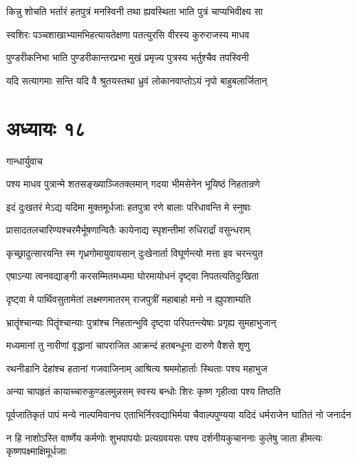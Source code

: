 \twolineshloka
{किन्नु शोचति भर्तारं हतपुत्रं मनस्विनी}
{तथा ह्यवस्थिता भाति पुत्रं चाप्यभिवीक्ष्य सा}


\twolineshloka
{स्वशिरः पञ्चशाखाभ्यामभिहत्यायतेक्षणा}
{पतत्युरसि वीरस्य कुरुराजस्य माधव}


\twolineshloka
{पुण्डरीकनिभा भाति पुण्डरीकान्तरप्रभा}
{मुखं प्रमृज्य पुत्रस्य भर्तुश्चैव तपस्विनी}


\twolineshloka
{यदि सत्यागमाः सन्ति यदि वै श्रुतयस्तथा}
{ध्रुवं लोकानवाप्तोऽयं नृपो बाहुबलार्जितान्}


\chapter{अध्यायः १८}
\twolineshloka
{गान्धार्युवाच}
{}


\twolineshloka
{पश्य माधव पुत्रान्मे शतसङ्ख्याञ्जितक्लमान्}
{गदया भीमसेनेन भूयिष्ठं निहतान्रणे}


\twolineshloka
{इदं दुःखतरं मेऽद्य यदिमा मुक्तमूर्धजाः}
{हतपुत्रा रणे बालाः परिधावन्ति मे स्नुषाः}


\twolineshloka
{प्रासादतलचारिण्यश्चरमैर्भूषणान्वितैः}
{कायेनाद्य स्पृशन्तीमां रुधिरार्द्रां वसुन्धराम्}


\twolineshloka
{कृच्छ्रादुत्सारयन्ति स्म गृध्रगोमायुवायसान्}
{दुःखेनार्ता विघूर्णन्त्यो मत्ता इव चरन्त्युत}


\twolineshloka
{एषाऽन्या त्वनवद्याङ्गी करसम्मितमध्यमा}
{घोरमायोधनं दृष्ट्वा निपतत्यतिदुःखिता}


\twolineshloka
{दृष्ट्वा मे पार्थिवसुतामेतां लक्ष्मणमातरम्}
{राजपुत्रीं महाबाहो मनो न ह्युपशाम्यति}


\twolineshloka
{भ्रातॄंश्चान्याः पितॄंश्चान्याः पुत्रांश्च निहतान्भुवि}
{दृष्ट्वा परिपतन्त्येषाः प्रगृह्य सुमहाभुजान्}


\twolineshloka
{मध्यमानां तु नारीणां वृद्धानां चापराजित}
{आक्रन्दं हतबन्धूना दारुणे वैशसे शृणु}


\twolineshloka
{रथनीडानि देहांश्च हतानां गजवाजिनाम्}
{आश्रित्य श्रममोहार्ताः स्थिताः पश्य महाभुज}


\twolineshloka
{अन्या चापहृतं कायाच्चारुकुण्डलमुन्नसम्}
{स्वस्य बन्धोः शिरः कृष्ण गृहीत्वा पश्य तिष्ठति}


\threelineshloka
{पूर्वजातिकृतं पापं मन्ये नाल्पमिवानघ}
{एताभिर्निरवद्याभिर्मया चैवाल्पपुण्यया}
{यदिदं धर्मराजेन घातितं नो जनार्दन}


न हि नाशोऽस्ति वार्ष्णेय कर्मणोः शुभपापयोः
\twolineshloka
{प्रत्यग्रवयसः पश्य दर्शनीयकुचाननाः}
{कुलेषु जाता हीमत्यः कृष्णपक्ष्माक्षिमूर्धजाः}


